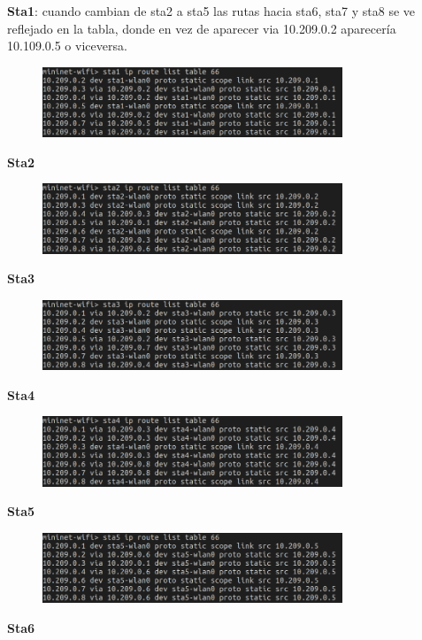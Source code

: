 \documentclass[12pt, a4paper]{report}
\begin{document}
\begin{enumerate}
	\textbf{Sta1}: cuando cambian de sta2 a sta5 las rutas hacia sta6, sta7 y sta8 se ve reflejado en la tabla, donde en vez de aparecer via 10.209.0.2 aparecería 10.109.0.5 o viceversa.
	\begin{figure}[H]
		\centering
		\includegraphics[width=0.8\textwidth]{ej2.2_2}
	\end{figure}
	\textbf{Sta2}
	\begin{figure}[H]
		\centering
		\includegraphics[width=0.8\textwidth]{ej2.2_3}
	\end{figure}
	\textbf{Sta3}
	\begin{figure}[H]
		\centering
		\includegraphics[width=0.8\textwidth]{ej2.2_4}
	\end{figure}
	\textbf{Sta4}
	\begin{figure}[H]
		\centering
		\includegraphics[width=0.8\textwidth]{ej2.2_5}
	\end{figure}
	\textbf{Sta5}
	\begin{figure}[H]
		\centering
		\includegraphics[width=0.8\textwidth]{ej2.2_6}
	\end{figure}
	\textbf{Sta6}
	\begin{figure}[H]

\end{figure}
\end{enumerate}
\end{document}
